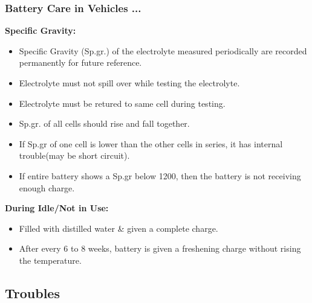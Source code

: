 \documentclass{beamer}
\begin{document}
\begin{frame}     %
  \frametitle{Battery Care in Vehicles ...}
  \fontsize{8pt}{14}\selectfont  
  
  \textbf{Specific Gravity:}
  \begin{itemize}
    \item Specific Gravity (Sp.gr.) of the electrolyte measured periodically are recorded permanently for future reference.
    \item Electrolyte must not spill over while testing the electrolyte.
    \item Electrolyte must be retured to same cell during testing.
    \item Sp.gr. of all cells should rise and fall together.
    \item If Sp.gr of one cell is lower than the other cells in series, it has internal trouble(may be short circuit).
    \item If entire battery shows a Sp.gr below 1200, then the battery is not receiving enough charge.
  \end{itemize}
  
  \textbf{During Idle/Not in Use:}
  \begin{itemize}
    \item Filled with distilled water \& given a complete charge.
    \item After every 6 to 8 weeks, battery is given a freshening charge without rising the temperature.
  \end{itemize}
\end{frame}


\subsection{Troubles}               %

{ %
    \begin{frame}[plain]
     \end{frame}
}
\end{document}
